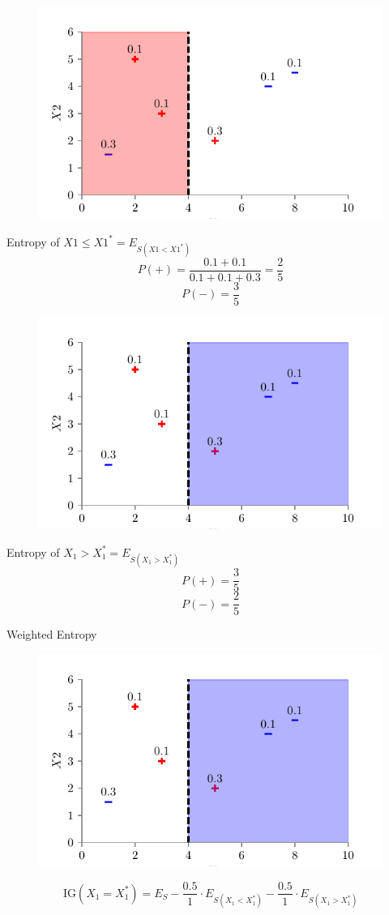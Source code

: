 \documentclass[usenames,dvipsnames]{beamer}
\begin{document}
\begin{frame}
\begin{figure}
    \centering
    \includegraphics{../assets/decision-trees/figures/dt_weighted/fig4.pdf}
\end{figure}
Entropy of \(X1 \leq X1^*  = E_{S(X1 < X1^*)}\)
$$P(+) = \frac{0.1 + 0.1}{0.1 + 0.1 + 0.3} = \frac{2}{5}$$
$$P(-) = \frac{3}{5}$$
\end{frame}
	
\begin{frame}
\begin{figure}
    \centering
    \includegraphics{../assets/decision-trees/figures/dt_weighted/fig5.pdf}
\end{figure}
Entropy of $X_1 > X_1^* = E_{S(X_1 > X_1^*)}$
$$P(+) = \frac{3}{5}$$
$$P(-) = \frac{2}{5}$$
\end{frame}
	
\begin{frame}{Weighted Entropy}
\begin{figure}
    \centering
    \includegraphics{../assets/decision-trees/figures/dt_weighted/fig5.pdf}
\end{figure}
$$\text{IG}(X_1 = X_1^*) = E_S - \frac{0.5}{1} \cdot E_{S(X_1 < X_1^*)} - \frac{0.5}{1} \cdot E_{S(X_1 > X_1^*)}$$
\end{frame}
\end{document}
